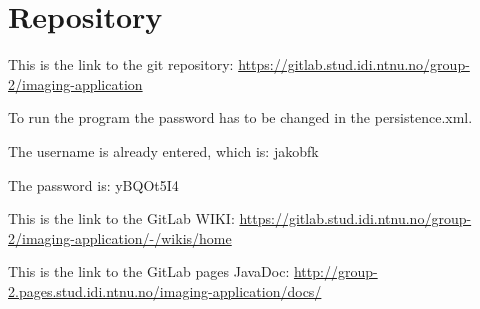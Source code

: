\section{Repository}

This is the link to the git repository:
\url{https://gitlab.stud.idi.ntnu.no/group-2/imaging-application}

To run the program the password has to be changed in the persistence.xml.

The username is already entered, which is: jakobfk

The password is: yBQOt5I4

This is the link to the GitLab WIKI:
\url{https://gitlab.stud.idi.ntnu.no/group-2/imaging-application/-/wikis/home}

This is the link to the GitLab pages JavaDoc:
\url{http://group-2.pages.stud.idi.ntnu.no/imaging-application/docs/}